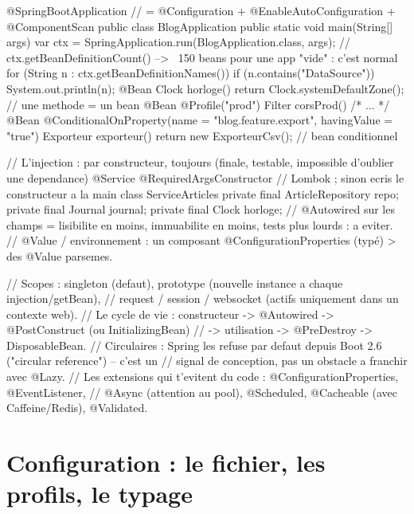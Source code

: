 \begin{codejava}
@SpringBootApplication                // = @Configuration + @EnableAutoConfiguration + @ComponentScan
public class BlogApplication {
    public static void main(String[] args) {
        var ctx = SpringApplication.run(BlogApplication.class, args);
        // ctx.getBeanDefinitionCount()  -->  ~150 beans pour une app "vide" : c'est normal
        for (String n : ctx.getBeanDefinitionNames()) { if (n.contains("DataSource")) System.out.println(n); }
    }
    @Bean
    Clock horloge() { return Clock.systemDefaultZone(); }            // une methode = un bean
    @Bean
    @Profile("prod")
    Filter corsProd() { /* ... */ }
    @Bean
    @ConditionalOnProperty(name = "blog.feature.export", havingValue = "true")
    Exporteur exporteur() { return new ExporteurCsv(); }             // bean conditionnel
}

// L'injection : par constructeur, toujours (finale, testable, impossible d'oublier une dependance)
@Service
@RequiredArgsConstructor                 // Lombok ; sinon ecris le constructeur a la main
class ServiceArticles {
    private final ArticleRepository repo;
    private final Journal journal;
    private final Clock horloge;
    // @Autowired sur les champs = lisibilite en moins, immuabilite en moins, tests plus lourds : a eviter.
    // @Value / environnement : un composant @ConfigurationProperties (typ\'e) > des @Value parsemes.
}

// Scopes : singleton (defaut), prototype (nouvelle instance a chaque injection/getBean),
// request / session / websocket (actifs uniquement dans un contexte web).
// Le cycle de vie : constructeur -> @Autowired -> @PostConstruct (ou InitializingBean)
//                   -> utilisation -> @PreDestroy -> DisposableBean.
// Circulaires : Spring les refuse par defaut depuis Boot 2.6 ("circular reference") -- c'est un
// signal de conception, pas un obstacle a franchir avec @Lazy.
// Les extensions qui t'evitent du code : @ConfigurationProperties, @EventListener,
// @Async (attention au pool), @Scheduled, @Cacheable (avec Caffeine/Redis), @Validated.
\end{codejava}

\section{Configuration : le fichier, les profils, le typage}

